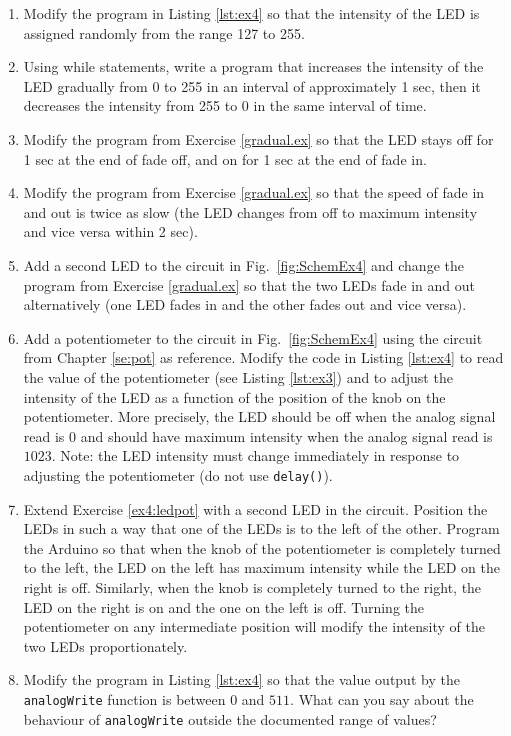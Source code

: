 \documentclass[12pt]{book}
\begin{document}
\begin{enumerate}[1.]
\item Modify the program in Listing \ref*{lst:ex4} so that the
  intensity of the LED is assigned randomly from the range 127 to
  255. 

\item\label{gradual.ex} Using while statements, write a program that
  increases the intensity of the LED gradually from 0 to 255 in an
  interval of approximately 1 sec, then it decreases the intensity
  from 255 to 0 in the same interval of time.
  
\item Modify the program from Exercise \ref{gradual.ex} so that the LED
  stays off for 1 sec at the end of fade off, and on for 1 sec at the
  end of fade in.

\item Modify the program from Exercise \ref{gradual.ex} so that the speed
  of fade in and out is twice as slow (the LED changes from off to
  maximum intensity and vice versa within 2 sec).

\item Add a second LED to the circuit in Fig.~\ref*{fig:SchemEx4} and
  change the program from Exercise \ref{gradual.ex} so that the two LEDs
  fade in and out alternatively (one LED fades in and the other fades
  out and vice versa).

\item\label{ex4:ledpot} Add a potentiometer to the circuit in
  Fig.~\ref*{fig:SchemEx4} using the circuit from Chapter \ref{se:pot}
  as reference. Modify the code in Listing \ref*{lst:ex4} to read the
  value of the potentiometer (see Listing \ref{lst:ex3}) and to adjust the intensity of the LED as
  a function of the position of the knob on the potentiometer. More
  precisely, the LED should be off when the analog signal read is $0$
  and should have maximum intensity when the analog signal read is $1023$.  Note: the LED intensity must change immediately in response to adjusting the potentiometer (do not use \lstinline$delay()$). 

\item Extend Exercise \ref*{ex4:ledpot} with a second LED in the
  circuit. Position the LEDs in such a way that one of the LEDs is to
  the left of the other. Program the Arduino so that when the knob of
  the potentiometer is completely turned to the left, the LED on the
  left has maximum intensity while the LED on the right is
  off. Similarly, when the knob is completely turned to the right, the
  LED on the right is on and the one on the left is off. Turning the
  potentiometer on any intermediate position will modify the intensity
  of the two LEDs proportionately. 

\item Modify the program in Listing \ref*{lst:ex4} so that the
  value output by the \lstinline$analogWrite$ function is between $0$
  and $511$. What can you say about the behaviour of
  \lstinline$analogWrite$ outside the documented range of values?
\end{enumerate}
\end{document}
